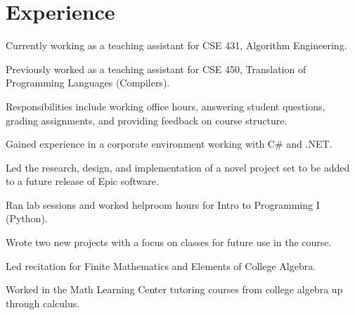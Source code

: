 \documentclass[]{deedy-resume-openfont}
\begin{document}
\hfill
\begin{minipage}[t]{0.66\textwidth} 


\section{Experience}

\vspace{\topsep} %
\begin{tightemize}
\item Currently working as a teaching assistant for CSE 431, Algorithm Engineering.
\item Previously worked as a teaching assistant for CSE 450, Translation of Programming Languages (Compilers).
\item Responsibilities include working office hours, answering student questions, grading assignments, and providing feedback on course structure.
\end{tightemize}
\sectionsep

\begin{tightemize}
\item Gained experience in a corporate environment working with C\# and .NET.
\item Led the research, design, and implementation of a novel project set to be added to a future release of Epic software.
\end{tightemize}
\sectionsep

\begin{tightemize}
\item Ran lab sessions and worked helproom hours for Intro to Programming I (Python).
\item Wrote two new projects with a focus on classes for future use in the course.
\end{tightemize}
\sectionsep

\begin{tightemize}
\item Led recitation for Finite Mathematics and Elements of College Algebra.
\item Worked in the Math Learning Center tutoring courses from college algebra up through calculus.
\end{tightemize}
\sectionsep


\end{minipage}
\end{document}
